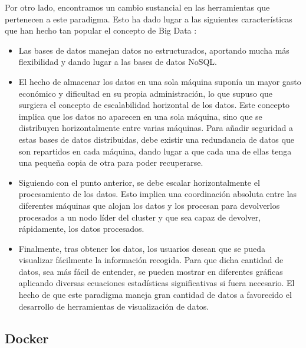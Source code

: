Por otro lado, encontramos un cambio sustancial en las herramientas que pertenecen a este paradigma. Esto ha dado lugar a las siguientes características que han hecho tan popular el concepto de Big Data \cite{BD-6}: 
\begin{itemize}
	\item Las bases de datos manejan datos no estructurados, aportando mucha más flexibilidad y dando lugar a las bases de datos NoSQL.
	\item El hecho de almacenar los datos en una sola máquina suponía un mayor gasto económico y dificultad en su propia administración, lo que supuso que surgiera el concepto de escalabilidad horizontal de los datos. Este concepto implica que los datos no aparecen en una sola máquina, sino que se distribuyen horizontalmente entre varias máquinas. Para añadir seguridad a estas bases de datos distribuidas, debe existir una redundancia de datos que son repartidos en cada máquina, dando lugar a que cada una de ellas tenga una pequeña copia de otra para poder recuperarse.
	\item Siguiendo con el punto anterior, se debe escalar horizontalmente el procesamiento de los datos. Esto implica una coordinación absoluta entre las diferentes máquinas que alojan los datos y los procesan para devolverlos procesados a un nodo líder del cluster y que sea capaz de devolver, rápidamente, los datos procesados.                   
	\item Finalmente, tras obtener los datos, los usuarios desean que se pueda visualizar fácilmente la información recogida. Para que dicha cantidad de datos, sea más fácil de entender, se pueden mostrar en diferentes gráficas aplicando diversas ecuaciones estadísticas significativas si fuera necesario. El hecho de que este paradigma maneja gran cantidad de datos a favorecido el desarrollo de herramientas de visualización de datos. 
\end{itemize}

\subsection{Docker\label{Docker}}



